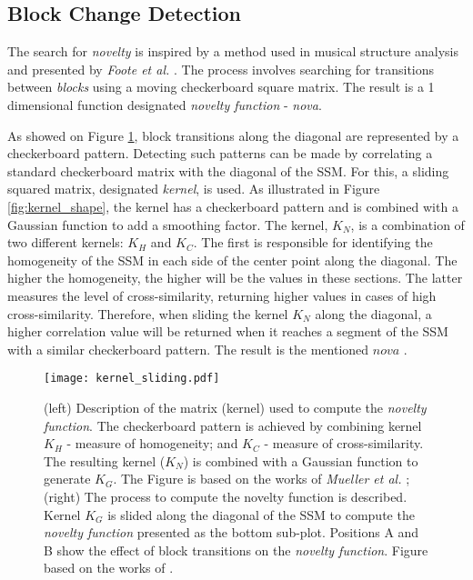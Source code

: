 \subsection{Block Change Detection}

The search for \textit{novelty} is inspired by a method used in musical structure analysis and presented by \textit{Foote et al.} \cite{foote2000}. The process involves searching for transitions between \textit{blocks} using a moving checkerboard square matrix. The result is a 1 dimensional function designated \textit{novelty function} - \textit{nova}.
\par
As showed on Figure \ref{fig:kernel_description}, block transitions along the diagonal are represented by a checkerboard pattern. Detecting such patterns can be made by correlating a standard checkerboard matrix with the diagonal of the \gls{SSM}. For this, a sliding squared matrix, designated \textit{kernel}, is used. As illustrated in Figure \ref{fig:kernel_shape}, the kernel has a checkerboard pattern and is combined with a Gaussian function to add a smoothing factor. The kernel, $K_N$, is a combination of two different kernels: $K_H$ and $K_C$. The first is responsible for identifying the homogeneity of the \gls{SSM} in each side of the center point along the diagonal. The higher the homogeneity, the higher will be the values in these sections. The latter measures the level of cross-similarity, returning higher values in cases of high cross-similarity. Therefore, when sliding the kernel $K_N$ along the diagonal, a higher correlation value will be returned when it reaches a segment of the \gls{SSM} with a similar checkerboard pattern. The result is the mentioned $nova$ \cite{Dannenberg2008, Mueller15_FMP_SPRINGER, MuellerZ19_FMP_ISMIR}.

\begin{figure}
    \centering
    \texttt{[image: kernel\_sliding.pdf]}
    \caption{(left) Description of the matrix (kernel) used to compute the \textit{novelty function}. The checkerboard pattern is achieved by combining kernel $K_H$ - measure of homogeneity; and $K_C$ - measure of cross-similarity. The resulting kernel ($K_N$) is combined with a Gaussian function to generate $K_G$. The Figure is based on the works of \textit{Mueller et al.} \cite{Mueller15_FMP_SPRINGER, MuellerZ19_FMP_ISMIR}; (right) The process to compute the novelty function is described. Kernel $K_G$ is slided along the diagonal of the \gls{SSM} to compute the \textit{novelty function} presented as the bottom sub-plot. Positions A and B show the effect of block transitions on the \textit{novelty function}. Figure based on the works of \cite{Dannenberg2008, Mueller15_FMP_SPRINGER, MuellerZ19_FMP_ISMIR}.}
    \label{fig:kernel_description}
\end{figure}

